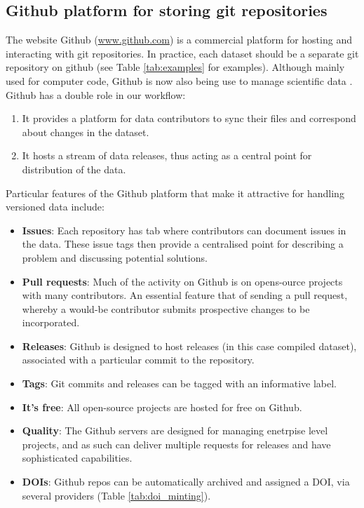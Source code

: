 \documentclass[a4paper,11pt]{article}
\newcommand{\smurl}[1]{{\footnotesize\url{#1}}}
\begin{document}
\subsection{Github platform for storing git repositories}

The website Github (\smurl{www.github.com}) is a commercial platform for
hosting and interacting with git repositories. In practice, each dataset
should be a separate git repository on github (see Table \ref{tab:examples} for
examples). Although mainly used for
computer code, Github is now also being use to manage scientific data
\citep{Perkel-2016}. Github has a double role in our workflow:
\begin{enumerate}
  \item It provides a platform for data contributors to sync their files
  and correspond about changes in the dataset.
  \item It hosts a stream of data releases, thus acting as a central
  point for distribution of the data.
\end{enumerate}


Particular features of the Github platform that make it attractive for
handling versioned data include:

\begin{itemize}
  \item \textbf{Issues}: Each repository has tab where contributors can document issues in the data. These issue tags then provide a centralised point for describing a problem and discussing potential solutions.
  \item \textbf{Pull requests}: Much of the activity on Github is on opens-ource projects with many contributors. An essential feature that of sending a pull request, whereby a would-be contributor submits prospective changes to be incorporated.
  \item \textbf{Releases}: Github is designed to host releases (in this case compiled dataset), associated with a particular commit to the repository.
  \item \textbf{Tags}: Git commits and releases can be tagged with an informative label.
  \item \textbf{It's free}: All open-source projects are hosted for free on Github.
  \item \textbf{Quality}: The Github servers are designed for managing enetrpise level projects, and as such can deliver multiple requests for releases and have sophisticated capabilities.
  \item \textbf{DOIs}: Github repos can be automatically archived and assigned a DOI, via several providers (Table \ref{tab:doi_minting}).
\end{itemize}
\end{document}
